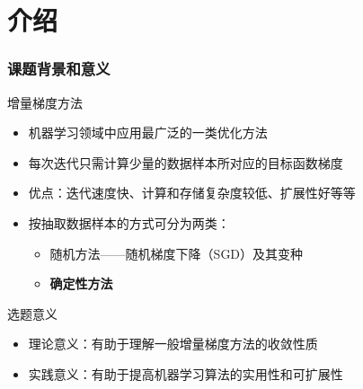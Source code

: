 \section{介绍}
\miniframesoff

\frame
{
\frametitle{课题背景和意义}
\begin{block}{增量梯度方法}
  \begin{itemize}
    \item 机器学习领域中应用最广泛的一类优化方法
    \item 每次迭代只需计算少量的数据样本所对应的目标函数梯度
    \item 优点：迭代速度快、计算和存储复杂度较低、扩展性好等等
    \item 按抽取数据样本的方式可分为两类：
      \begin{itemize}
        \item 随机方法——随机梯度下降（SGD）及其变种
        \item \textbf{确定性方法}
      \end{itemize}
  \end{itemize}
\end{block}

\pause

\begin{block}{选题意义}
  \begin{itemize}
    \item 理论意义：有助于理解一般增量梯度方法的收敛性质
    \item 实践意义：有助于提高机器学习算法的实用性和可扩展性
  \end{itemize}
\end{block}
}


